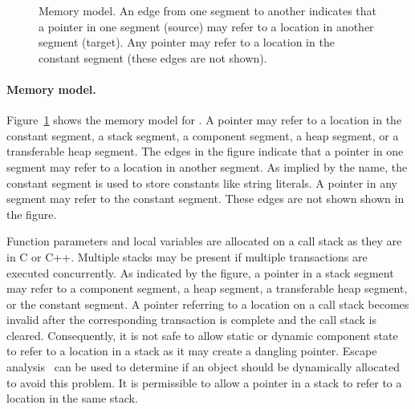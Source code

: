 \begin{figure}
{
}%
\caption{Memory model.
An edge from one segment to another indicates that a pointer in one segment (source) may refer to a location in another segment (target).
Any pointer may refer to a location in the constant segment (these edges are not shown).}
\label{memory_model}
\end{figure}

\paragraph{Memory model.}
Figure~\ref{memory_model} shows the memory model for \rcgo{}.
A pointer may refer to a location in the constant segment, a stack segment, a component segment, a heap segment, or a transferable heap segment.
The edges in the figure indicate that a pointer in one segment may refer to a location in another segment.
As implied by the name, the constant segment is used to store constants like string literals.
A pointer in any segment may refer to the constant segment.
These edges are not shown shown in the figure.

Function parameters and local variables are allocated on a call stack as they are in C or C++.
Multiple stacks may be present if multiple transactions are executed concurrently.
As indicated by the figure, a pointer in a stack segment may refer to a component segment, a heap segment, a transferable heap segment, or the constant segment.
A pointer referring to a location on a call stack becomes invalid after the corresponding transaction is complete and the call stack is cleared.
Consequently, it is not safe to allow static or dynamic component state to refer to a location in a stack as it may create a dangling pointer.
Escape analysis~\cite{Park:1992:EAL:143095.143125} can be used to determine if an object should be dynamically allocated to avoid this problem.
It is permissible to allow a pointer in a stack to refer to a location in the same stack.


